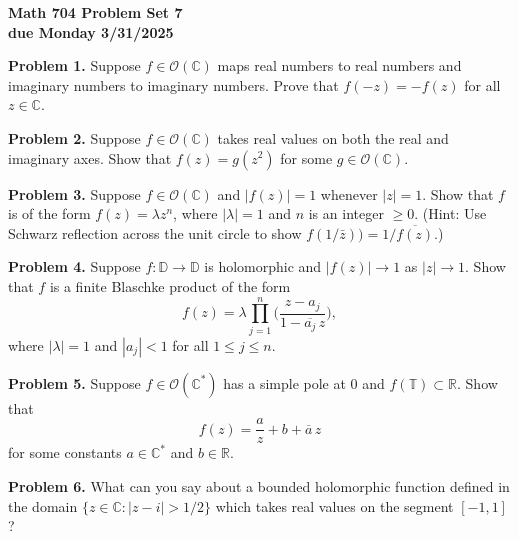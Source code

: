 \documentclass[12pt]{amsart}
\newcommand{\ov}{\overline}
\newcommand{\OO}{{\mathcal O}}
\newcommand{\CC}{{\mathbb C}}
\newcommand{\RR}{{\mathbb R}}
\newcommand{\TT}{{\mathbb T}}
\newcommand{\DD}{{\mathbb D}}
\newcommand{\vs}{\vspace{2mm}}
\newcommand{\Cstar}{{\mathbb  C}^*}
\begin{document}
\begin{center}
{\bf \large Math 704 Problem Set 7} \vs \\
{\bf due Monday 3/31/2025} \vs \vs
\end{center}

\noindent
{\bf Problem 1.} Suppose $f \in \OO(\CC)$ maps real numbers to real numbers and imaginary numbers to imaginary numbers. Prove that $f(-z)=-f(z)$ for all $z \in \CC$. \vs 

\noindent
{\bf Problem 2.} Suppose $f \in \OO(\CC)$ takes real values on both the real and imaginary axes. Show that $f(z)=g(z^2)$ for some $g \in \OO(\CC)$. \vs

\noindent
{\bf Problem 3.} Suppose $f \in \OO(\CC)$ and $|f(z)|=1$ whenever $|z|=1$. Show that $f$ is of the form $f(z)=\lambda z^n$, where $|\lambda|=1$ and $n$ is an integer $\geq 0$. (Hint: Use Schwarz reflection across the unit circle to show $f(1/\bar{z})) = 1/\ov{f(z)}$.) \vs  

\noindent
{\bf Problem 4.} Suppose $f:\DD \to \DD$ is holomorphic and $|f(z)| \to 1$ as $|z| \to 1$. Show that $f$ is a finite Blaschke product of the form 
$$
f(z)=\lambda \prod_{j=1}^n \Big( \frac{z-a_j}{1-\ov{a_j}\, z} \Big),
$$  
where $|\lambda|=1$ and $|a_j|<1$ for all $1 \leq j \leq n$. \vs

\noindent
{\bf Problem 5.} Suppose $f \in \OO(\Cstar)$ has a simple pole at $0$ and $f(\TT) \subset \RR$. Show that
$$
f(z)=\frac{a}{z}+b+\ov{a} \, z
$$
for some constants $a \in \Cstar$ and $b \in \RR$. \vs

\noindent
{\bf Problem 6.} What can you say about a bounded holomorphic function defined in the domain $\{ z \in \CC : |z-i|>1/2 \}$ which takes real values on the segment $[-1,1]$? 
\end{document}

